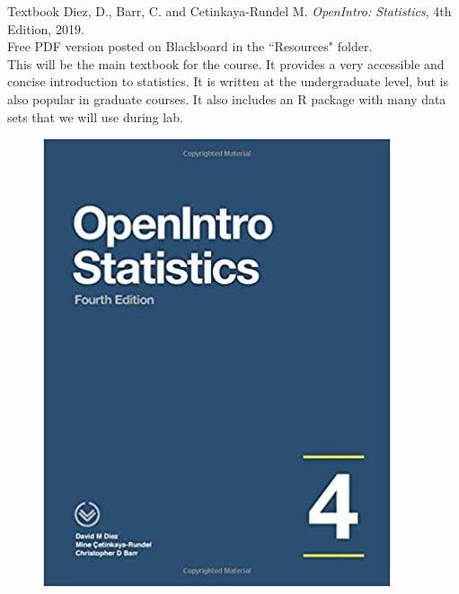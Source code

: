 \documentclass[10pt]{beamer}
\begin{document}
\begin{frame}{Textbook}
Diez, D., Barr, C. and Cetinkaya-Rundel M. \emph{OpenIntro: Statistics}, 4th Edition, 2019.\\
\vspace{5pt}
Free PDF version posted on Blackboard in the ``Resources" folder.\\
\vspace{10pt}
This will be the main textbook for the course.  It provides a very accessible and concise introduction to statistics.  It is written at the undergraduate level, but is also popular in graduate courses.  It also includes an R package with many data sets that we will use during lab.  
\begin{figure}
\flushright
\includegraphics[scale=0.15]{figure/oi_cover.jpg}
\end{figure}
\end{frame}
\end{document}
